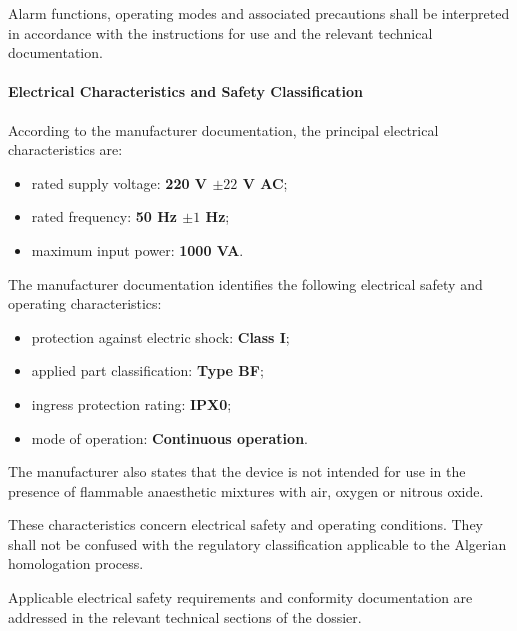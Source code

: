 Alarm functions, operating modes and associated precautions
shall be interpreted in accordance with the instructions for use
and the relevant technical documentation.


\paragraph{Electrical Characteristics and Safety Classification}

According to the manufacturer documentation, the principal
electrical characteristics are:

\begin{itemize}
    \item rated supply voltage:
    \textbf{220 V $\pm 22$ V AC};
    \item rated frequency:
    \textbf{50 Hz $\pm 1$ Hz};
    \item maximum input power: \textbf{1000 VA}.
\end{itemize}

The manufacturer documentation identifies the following
electrical safety and operating characteristics:

\begin{itemize}
    \item protection against electric shock: \textbf{Class I};
    \item applied part classification: \textbf{Type BF};
    \item ingress protection rating: \textbf{IPX0};
    \item mode of operation: \textbf{Continuous operation}.
\end{itemize}

The manufacturer also states that the device is not intended for
use in the presence of flammable anaesthetic mixtures with air,
oxygen or nitrous oxide.

These characteristics concern electrical safety and operating
conditions. They shall not be confused with the regulatory
classification applicable to the Algerian homologation process.

Applicable electrical safety requirements and conformity
documentation are addressed in the relevant technical sections
of the dossier.


